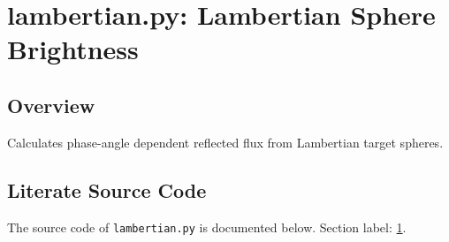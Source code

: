 \documentclass[10pt,a4paper]{report}
\begin{document}
\begin{lstlisting}[language=Python,caption={radiometry\_calcs.py Source Code},label={code:radiometrycalcs}]
\end{lstlisting}



\chapter{lambertian.py: Lambertian Sphere Brightness}
\label{sec:lambertian}

\section*{Overview}
Calculates phase-angle dependent reflected flux from Lambertian target spheres.

\section*{Literate Source Code}
The source code of \texttt{lambertian.py} is documented below. Section label: \ref{sec:lambertian}.
\end{document}
